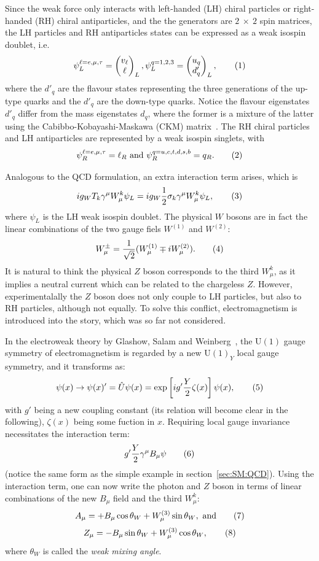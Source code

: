 Since the weak force only interacts with left-handed (LH) chiral particles 
or right-handed (RH) chiral antiparticles,
and the the generators are $2\ \times\ 2$ spin matrices, 
the LH particles and RH antiparticles states can be expressed as a weak isospin doublet, i.e.\ 
\[\psi^{\ell=e,\mu,\tau}_L = \begin{pmatrix} v_\ell \\ \ell \\ \end{pmatrix}_L, 
\psi^{q=1,2,3}_L = \begin{pmatrix} u_q\\ d'_q \\ \end{pmatrix}_L,  \addtag \]
where the $d'_q$ are the flavour states representing the three generations of the up-type quarks 
and the $d'_q$ are the down-type quarks. Notice the flavour eigenstates $d'_q$ differ from the mass
eigenstates $d_q$, where the former is a mixture of the latter using the Cabibbo-Kobayashi-Maskawa (CKM)
matrix~\cite{CKM}.
The RH chiral particles and LH antiparticles are represented by a weak isospin singlets, with 
\[\psi^{\ell=e,\mu, \tau}_R = \ell_R\ \text{and}\ \psi^{q=u,c,t,d,s,b}_R =  q_R . \addtag \]

Analogous to the QCD formulation, an extra interaction term arises,
which is 
\[
    ig_WT_k\gamma^\mu W^k_\mu \psi_L = ig_W \frac{1}{2} \sigma_k\gamma^\mu W^k_\mu \psi_L, \addtag \]
where $\psi_L$ is the LH weak isospin doublet. 
The physical $W$ bosons are in fact the linear combinations 
of the two gauge fiels $W^{(1)}$ and $W^{(2)}$:
\[
W^\pm_\mu = \frac{1}{\sqrt{2}}(W^{(1)}_\mu \mp i W^{(2)}_\mu) .
\addtag \]
It is natural to think the physical $Z$ boson corresponds to the 
third $W^k_\mu$, as it implies a neutral current which can be related 
to the chargeless $Z$. However, experimentalally the $Z$ boson does not
only couple to LH particles, but also to RH particles, although not equally.
To solve this conflict, electromagnetism is introduced into the story, which was
so far not considered. 

In the electroweak theory by Glashow, Salam and Weinberg~\cite{Glashow,Salam,Weinberg},
the $\text{U}(1)$ gauge symmetry of electromagnetism is regarded by a new $\text{U}(1)_Y$
local gauge symmetry, 
and it transforms as: 
\[
    \psi(x) \rightarrow \psi(x) ' = \hat{U}\psi(x) =  \text{exp}\left[  ig' \frac{Y}{2}\zeta(x) \right] \psi(x),\addtag \]
with $g'$ being a new coupling constant (its relation will become clear in the following),
$\zeta(x)$ being some fuction in $x$.
Requiring local gauge invariance necessitates the interaction term:
\[
    g' \frac{Y}{2}\gamma^\mu B_\mu \psi \addtag \] 
(notice the same form as the simple example in section~\ref{sec:SM:QCD}).
Using the interaction term, one can now write the photon and $Z$ boson 
in terms of linear combinations of the new $B_\mu$ field and the third $W^k_\mu$:
\[
A_\mu = + B_\mu \cos\theta_W + W^{(3)}_\mu \sin\theta_W,\  \text{and}
\addtag \]
\[
Z_\mu = - B_\mu \sin\theta_W + W^{(3)}_\mu \cos\theta_W, 
\addtag \]
where $\theta_W$ is called the \textit{weak mixing angle}. 

